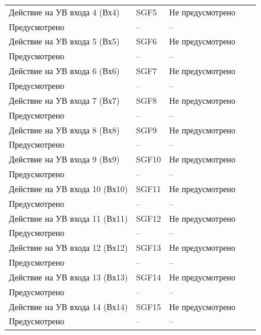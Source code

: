 \begin{longtable}{|>{\centering\arraybackslash}m{5.3cm}|>{\centering\arraybackslash}m{3.3cm}|>{\centering\arraybackslash}m{4.2cm}|>{\centering\arraybackslash}m{1.8cm}|>{\centering\arraybackslash}m{1cm}|}
\hline
\centering Действие на УВ входа 4 (Вх4)  & \centering SGF5 & \centering Не предусмотрено \\ Предусмотрено & \centering -- & \centering \arraybackslash -- \\
\hline
\centering Действие на УВ входа 5 (Вх5)  & \centering SGF6 & \centering Не предусмотрено \\ Предусмотрено & \centering -- & \centering \arraybackslash -- \\
\hline
\centering Действие на УВ входа 6 (Вх6)  & \centering SGF7 & \centering Не предусмотрено \\ Предусмотрено & \centering -- & \centering \arraybackslash -- \\
\hline
\centering Действие на УВ входа 7 (Вх7)  & \centering SGF8 & \centering Не предусмотрено \\ Предусмотрено & \centering -- & \centering \arraybackslash -- \\
\hline
\centering Действие на УВ входа 8 (Вх8)  & \centering SGF9 & \centering Не предусмотрено \\ Предусмотрено & \centering -- & \centering \arraybackslash -- \\
\hline
\centering Действие на УВ входа 9 (Вх9)  & \centering SGF10 & \centering Не предусмотрено \\ Предусмотрено & \centering -- & \centering \arraybackslash -- \\
\hline
\centering Действие на УВ входа 10 (Вх10)  & \centering SGF11 & \centering Не предусмотрено \\ Предусмотрено & \centering -- & \centering \arraybackslash -- \\
\hline
\centering Действие на УВ входа 11 (Вх11)  & \centering SGF12 & \centering Не предусмотрено \\ Предусмотрено & \centering -- & \centering \arraybackslash -- \\
\hline
\centering Действие на УВ входа 12 (Вх12)  & \centering SGF13 & \centering Не предусмотрено \\ Предусмотрено & \centering -- & \centering \arraybackslash -- \\
\hline
\centering Действие на УВ входа 13 (Вх13)  & \centering SGF14 & \centering Не предусмотрено \\ Предусмотрено & \centering -- & \centering \arraybackslash -- \\
\hline
\centering Действие на УВ входа 14 (Вх14)  & \centering SGF15 & \centering Не предусмотрено \\ Предусмотрено & \centering -- & \centering \arraybackslash -- \\

\end{longtable}
